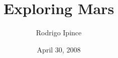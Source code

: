 \documentclass[titlepage]{article}
\begin{document}
	\title{Exploring Mars}
	\author{Rodrigo Ipince}
	\date{April 30, 2008}
	
	\maketitle
		
	\tableofcontents
	
	\newpage
	
	
	
	
	
	
	
	
\end{document}

